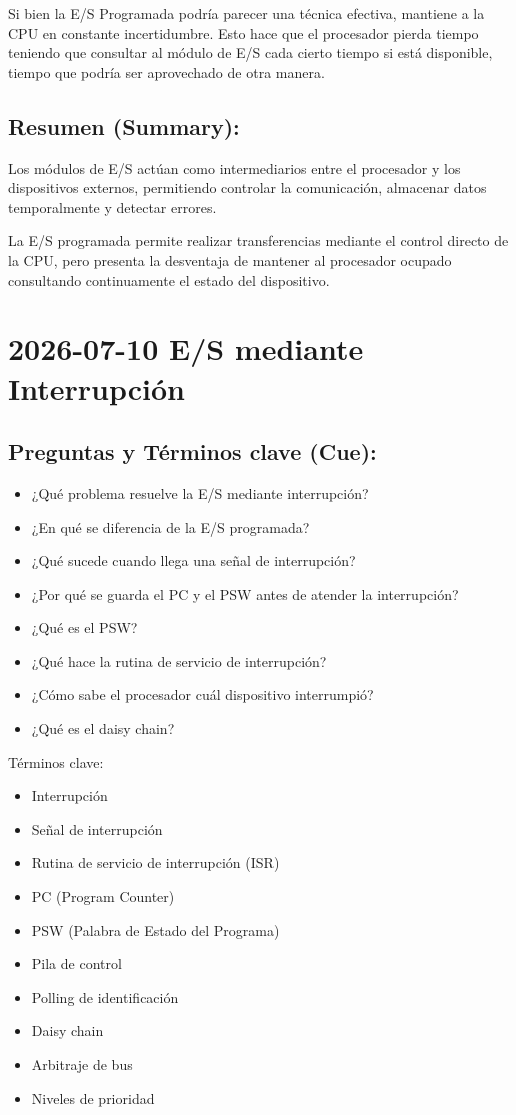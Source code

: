 \documentclass{article}
\begin{document}
Si bien la E/S Programada podría parecer una técnica efectiva, mantiene a
la CPU en constante incertidumbre. Esto hace que el procesador pierda tiempo
teniendo que consultar al módulo de E/S cada cierto tiempo si está disponible,
tiempo que podría ser aprovechado de otra manera.

\subsection{Resumen (Summary):}
\label{sec:org205b191}

Los módulos de E/S actúan como intermediarios entre el procesador y los
dispositivos externos, permitiendo controlar la comunicación, almacenar datos
temporalmente y detectar errores.

La E/S programada permite realizar transferencias mediante el control directo
de la CPU, pero presenta la desventaja de mantener al procesador ocupado
consultando continuamente el estado del dispositivo.

\section{2026-07-10 E/S mediante Interrupción}
\label{sec:orge94830b}

\subsection{Preguntas y Términos clave (Cue):}
\label{sec:orgb4fe45d}
\begin{itemize}
\item ¿Qué problema resuelve la E/S mediante interrupción?
\item ¿En qué se diferencia de la E/S programada?
\item ¿Qué sucede cuando llega una señal de interrupción?
\item ¿Por qué se guarda el PC y el PSW antes de atender la interrupción?
\item ¿Qué es el PSW?
\item ¿Qué hace la rutina de servicio de interrupción?
\item ¿Cómo sabe el procesador cuál dispositivo interrumpió?
\item ¿Qué es el daisy chain?
\end{itemize}

Términos clave:
\begin{itemize}
\item Interrupción
\item Señal de interrupción
\item Rutina de servicio de interrupción (ISR)
\item PC (Program Counter)
\item PSW (Palabra de Estado del Programa)
\item Pila de control
\item Polling de identificación
\item Daisy chain
\item Arbitraje de bus
\item Niveles de prioridad
\end{itemize}
\end{document}
